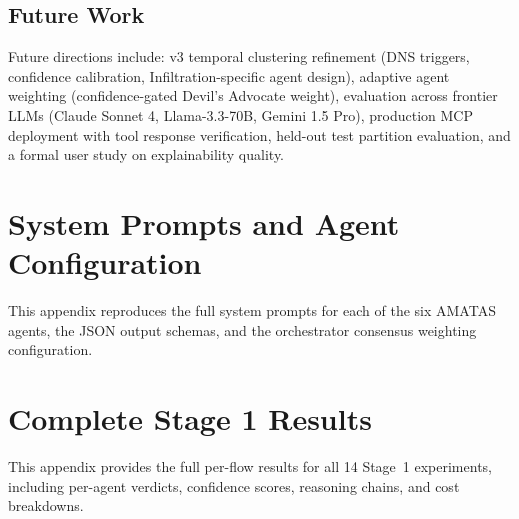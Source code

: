 \documentclass[12pt,openany,oneside,a4paper]{book}
\begin{document}
\section{Future Work}
\label{sec:future}
Future directions include: v3 temporal clustering refinement (DNS triggers, confidence calibration, Infiltration-specific agent design), adaptive agent weighting (confidence-gated Devil's Advocate weight), evaluation across frontier LLMs (Claude Sonnet 4, Llama-3.3-70B, Gemini 1.5 Pro), production MCP deployment with tool response verification, held-out test partition evaluation, and a formal user study on explainability quality.


\appendix

\chapter{System Prompts and Agent Configuration}
\label{app:prompts}
This appendix reproduces the full system prompts for each of the six AMATAS agents, the JSON output schemas, and the orchestrator consensus weighting configuration.

\chapter{Complete Stage 1 Results}
\label{app:stage1-results}
This appendix provides the full per-flow results for all 14 Stage~1 experiments, including per-agent verdicts, confidence scores, reasoning chains, and cost breakdowns.

\begingroup
\small
\setlength{\bibitemsep}{0.5em}
\printbibliography[heading=bibintoc,title={References}]
\endgroup
\end{document}

